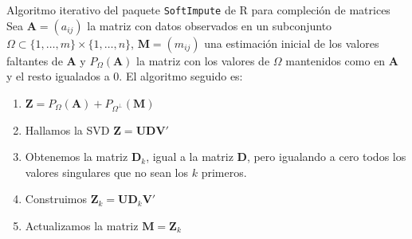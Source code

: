 \documentclass{beamer}
\begin{document}
\begin{frame}{Algoritmo iterativo del paquete \texttt{SoftImpute} de R para compleción de matrices}
Sea $\mathbf{A} = (a_{ij})$ la matriz con datos observados en un subconjunto $\Omega \subset \{1, \ldots, m\} \times \{1, \ldots, n\}$, $\mathbf{M} = (m_{ij})$ una estimación inicial de los valores faltantes de $\mathbf{A}$ y $P_\Omega (\mathbf{A})$ la matriz con los valores de $\Omega$ mantenidos como en $\mathbf{A}$ y el resto igualados a $0$. El algoritmo seguido es:
\begin{enumerate}
    \item $\mathbf{Z} = P_\Omega(\mathbf{A}) + P_{\Omega^{\bot}}(\mathbf{M})$
    \item Hallamos la SVD $\mathbf{Z=UDV'}$
    \item Obtenemos la matriz $\mathbf{D}_k$, igual a la matriz $\mathbf{D}$, pero igualando a cero todos los valores singulares que no sean los $k$ primeros.
    \item Construimos $\mathbf{Z}_k=\mathbf{UD}_k\mathbf{V'}$
    \item Actualizamos la matriz $\mathbf{M=Z}_k$
\end{enumerate}
\end{frame}
\end{document}
